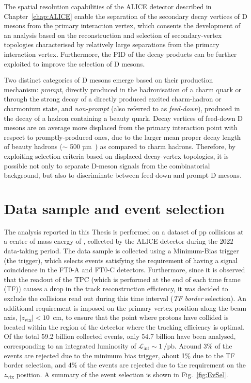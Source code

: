 The spatial resolution capabilities of the ALICE detector described in Chapter~\ref{chap:ALICE} enable the separation of the secondary decay vertices of D mesons from the primary interaction vertex, which consents the development of an analysis based on the reconstruction and selection of secondary-vertex topologies characterised by relatively large separations from the primary interaction vertex. Furthermore, the PID of the decay products can be further exploited to improve the selection of D mesons.

Two distinct categories of D mesons emerge based on their production mechanism: \emph{prompt}, directly produced in the hadronisation of a charm quark or through the strong decay of a directly produced excited charm-hadron or charmonium state, and \emph{non-prompt} (also referred to as \emph{feed-down}), produced in the decay of a hadron containing a beauty quark. Decay vertices of feed-down D mesons are on average more displaced from the primary interaction point with respect to promptly-produced ones, due to the larger mean proper decay length of beauty hadrons (\ct $\sim$ 500 µm~\cite{pdg}) as compared to charm hadrons. Therefore, by exploiting selection criteria based on displaced decay-vertex topologies, it is possible not only to separate D-meson signals from the combinatorial background, but also to discriminate between feed-down and prompt D mesons.

\section{Data sample and event selection}
The analysis reported in this Thesis is performed on a dataset of pp collisions at a centre-of-mass energy of \thirteen, collected by the ALICE detector during the 2022 data-taking period. The data sample is collected using a Minimum-Bias trigger (the  trigger), which selects events satisfying the requirement of having a signal coincidence in the FT0-A and FT0-C detectors. Furthermore, since it is observed that the readout of the TPC (which is performed at the end of each time frame (TF)) causes a drop in the track reconstruction efficiency, it was decided to exclude the collisions read out during this time interval (\emph{TF border} selection). An additional requirement is imposed on the primary vertex position along the beam axis, $\lvert z_{\mathrm{vtx}}\rvert<10$~cm, to ensure that the point where protons have collided is located within the region of the detector where the tracking efficiency is optimal. Of the total 59.2 billion collected events, only 54.7 billion have been analysed, corresponding to an integrated luminosity of $\mathcal{L}_\mathrm{int}\sim \SI{1}{\per\pico\barn}$. Around 3\% of the events are rejected due to the minimum bias trigger, about 1\% due to the TF border selection, and 4\% of the events are rejected due to the requirement on the $z_{\mathrm{vtx}}$ position. A summary of the event selection is shown in Fig.~\ref{fig:EvSel}.


